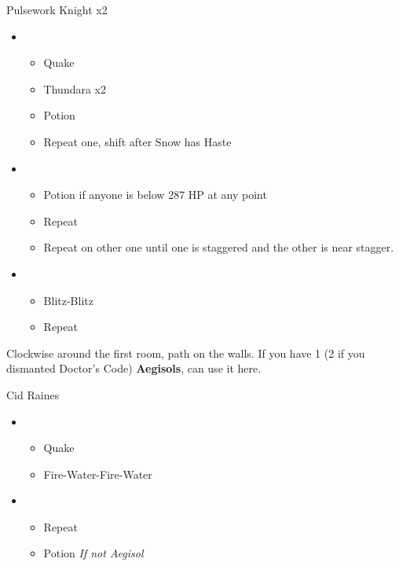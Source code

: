\begin{multicols}{2}
  \begin{battle}[0:36]{Pulsework Knight x2}
    \begin{itemize}
      \item \first
            \begin{itemize}
              \item Quake
              \item Thundara x2
              \item Potion
              \item Repeat one, shift after Snow has Haste
            \end{itemize}
      \item \second
            \begin{itemize}
              \item Potion if anyone is below 287 HP at any point
              \item Repeat
              \item Repeat on other one until one is staggered and the other is near stagger.
            \end{itemize}
      \item \sixth
            \begin{itemize}
              \item Blitz-Blitz
              \item Repeat
            \end{itemize}
    \end{itemize}
  \end{battle}
  Clockwise around the first room, path on the walls.
  If you have 1 (2 if you dismanted Doctor's Code) \textbf{Aegisols}, can use it here.
  \begin{battle}[1:40]{Cid Raines}
    \begin{itemize}
      \item \first
            \begin{itemize}
              \item Quake
              \item Fire-Water-Fire-Water
            \end{itemize}
      \item \third
            \begin{itemize}
              \item Repeat
              \item Potion \textit{If not Aegisol}

\end{itemize}
\end{itemize}
\end{battle}
\end{multicols}
